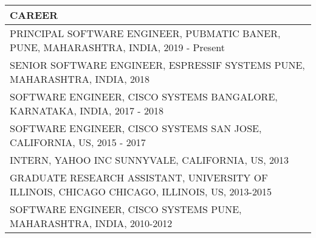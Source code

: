 \documentclass[a4paper,8pt]{extarticle}
\newcommand{\redfont}[1]{%
	{\color{textred}%
	\fontspec{Fjalla One}%
	\fontsize{14pt}{18pt}%
	\selectfont #1}}
\begin{document}
\bigskip
\begin{tabularx}{\linewidth}{X}
\large CAREER	\\\toprule
\redfont{PRINCIPAL SOFTWARE ENGINEER, PUBMATIC}\newline
BANER, PUNE, MAHARASHTRA, INDIA, 2019 - Present \\
\redfont{SENIOR SOFTWARE ENGINEER, ESPRESSIF SYSTEMS}\newline
PUNE, MAHARASHTRA, INDIA, 2018 \\
\redfont{SOFTWARE ENGINEER, CISCO SYSTEMS}\newline
BANGALORE, KARNATAKA, INDIA, 2017 - 2018 \\
\redfont{SOFTWARE ENGINEER, CISCO SYSTEMS}\newline
SAN JOSE, CALIFORNIA, US, 2015 - 2017	\\
\redfont{INTERN, YAHOO INC}\newline
SUNNYVALE, CALIFORNIA, US, 2013 \\
\redfont{GRADUATE RESEARCH ASSISTANT, UNIVERSITY OF ILLINOIS, CHICAGO}\newline
CHICAGO, ILLINOIS, US, 2013-2015 \\
\redfont{SOFTWARE ENGINEER, CISCO SYSTEMS}\newline
PUNE, MAHARASHTRA, INDIA, 2010-2012	\\
\end{tabularx}
\end{document}
